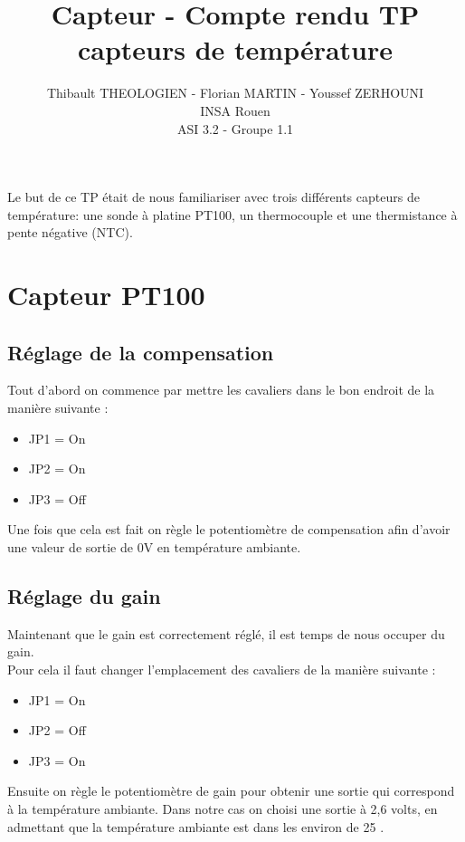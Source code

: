\documentclass[a4paper,12pt]{article}
\title{Capteur - Compte rendu TP capteurs de température}
\author{
	Thibault THEOLOGIEN - Florian MARTIN - Youssef ZERHOUNI\\
	INSA Rouen\\
	ASI 3.2 - Groupe 1.1
}
\begin{document}
	\maketitle
	\tableofcontents
	\newpage

  \par Le but de ce TP était de nous familiariser avec trois différents capteurs de température: une sonde à platine PT100, un thermocouple et une thermistance à pente négative (NTC).

  \section{Capteur PT100}

    \subsection{Réglage de la compensation}
      \par Tout d'abord on commence par mettre les cavaliers dans le bon endroit de la manière suivante :
      \begin{itemize}
        \item JP1 = On
        \item JP2 = On
        \item JP3 = Off
      \end{itemize}
      Une fois que cela est fait on règle le potentiomètre de compensation afin d'avoir une valeur de sortie de 0V en température ambiante.

    \subsection{Réglage du gain}
      \par Maintenant que le gain est correctement réglé, il est temps de nous occuper du gain.\\
      Pour cela il faut changer l'emplacement des cavaliers de la manière suivante :
      \begin{itemize}
        \item JP1 = On
        \item JP2 = Off
        \item JP3 = On
      \end{itemize}
      Ensuite on règle le potentiomètre de gain pour obtenir une sortie qui correspond à la température ambiante.
      Dans notre cas on choisi une sortie à 2,6 volts, en admettant que la température ambiante est dans les environ de 25 \degre.
\end{document}
